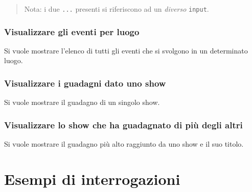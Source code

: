 \documentclass[a4paper,11pt]{article}
\begin{document}
\begin{quote}
  Nota: i due \texttt{...} presenti si riferiscono ad un \emph{diverso} \texttt{input}.
\end{quote}

\subsubsection{Visualizzare gli eventi per luogo}
Si vuole mostrare l'elenco di tutti gli eventi che si svolgono in un determinato luogo.


\subsubsection{Visualizzare i guadagni dato uno show}
Si vuole mostrare il guadagno di un singolo show.


\subsubsection{Visualizzare lo show che ha guadagnato di più degli altri}
Si vuole mostrare il guadagno pi\`u alto raggiunto da uno show e il suo titolo.


\section{Esempi di interrogazioni}
\end{document}
